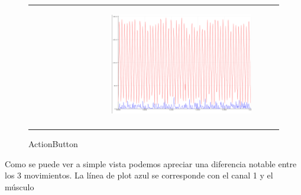 \begin{figure}[!h]
\begin{tabular}[c]{cc}
\begin{subfigure}[c]{0.5\textwidth, scale=0.5}
    \end{subfigure}&
    \begin{subfigure}[c]{0.5\textwidth, scale=0.5}
      \includegraphics[width=\textwidth]{imaxes/resting.png}
      
    \end{subfigure}\\
    \caption{ActionButton}
  \end{tabular}    
 
\end{figure}

Como se puede ver a simple vista podemos apreciar una diferencia notable entre los 3 movimientos. La línea de plot azul se corresponde con el canal 1 y el músculo 



